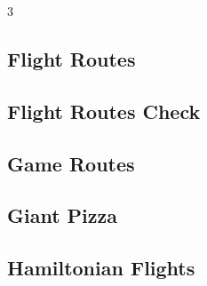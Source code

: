 \documentclass[8pt]{extarticle}
\begin{document}
\begin{multicols*}{3}
\subsection{Flight Routes}
\begin{caixaenunciado}

\end{caixaenunciado}
\vspace{0.3cm}


\subsection{Flight Routes Check}
\begin{caixaenunciado}

\end{caixaenunciado}
\vspace{0.3cm}


\subsection{Game Routes}
\begin{caixaenunciado}

\end{caixaenunciado}
\vspace{0.3cm}


\subsection{Giant Pizza}
\begin{caixaenunciado}

\end{caixaenunciado}
\vspace{0.3cm}


\subsection{Hamiltonian Flights}
\begin{caixaenunciado}

\end{caixaenunciado}
\vspace{0.3cm}



\end{multicols*}
\end{document}
